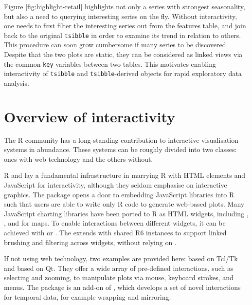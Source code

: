 Figure \ref{fig:highlight-retail} highlights not only a series with
strongest seasonality, but also a need to querying interesting series on
the fly. Without interactivity, one needs to first filter the
interesting series out from the features table, and join back to the
original \texttt{tsibble} in order to examine its trend in relation to
others. This procedure can soon grow cumbersome if many series to be
discovered. Despite that the two plots are static, they can be
considered as linked views via the common \texttt{key} variables between
two tables. This motivates enabling interactivity of \texttt{tsibble}
and \texttt{tsibble}-derived objects for rapid exploratory data
analysis.

\hypertarget{overview-of-interactivity}{%
\section{Overview of interactivity}\label{overview-of-interactivity}}

The R community has a long-standing contribution to interactive
visualisation systems in abundance. These systems can be roughly divided
into two classes: ones with web technology and the others without.

R  \citep{R-shiny} and 
\citep{R-htmlwidgets} lay a fundamental infrastructure in marrying R
with HTML elements and JavaScript for interactivity, although they
seldom emphasise on interactive graphics. The 
package opens a door to embedding JavaScript libraries into R such that
users are able to write only R code to generate web-based plots. Many
JavaScript charting libraries have been ported to R as HTML widgets,
including  \citep{plotly2020}, 
\citep{R-rbokeh}, and  \citep{R-leaflet} for maps. To
enable interactions between different widgets, it can be achieved with
 or  \citep{R-crosstalk}. The
 extends  with shared R6
instances to support linked brushing and filtering across widgets,
without relying on .

If not using web technology, two examples are provided here:
 \citep{R-loon} based on Tcl/Tk and 
\citep{xie_reactive_2014} based on Qt. They offer a wide array of
pre-defined interactions, such as selecting and zooming, to manipulate
plots via mouse, keyboard strokes, and menus. The 
package \citep{cheng_enabling_2016} is an add-on of , which
develops a set of novel interactions for temporal data, for example
wrapping and mirroring.

